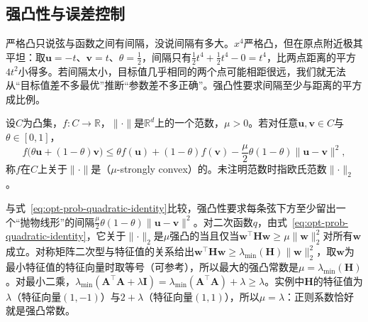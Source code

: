 \subsection{强凸性与误差控制}
\label{sec:opt-prob-strong-convexity}

严格凸只说弦与函数之间有间隔，没说间隔有多大。$x^4$严格凸，但在原点附近极其平坦：取$\bm u=-t$、$\bm v=t$、$\theta=\frac12$，间隔只有$\frac12t^4+\frac12t^4-0=t^4$，比两点距离的平方$4t^2$小得多。若间隔太小，目标值几乎相同的两个点可能相距很远，我们就无法从“目标值差不多最优”推断“参数差不多正确”。强凸性要求间隔至少与距离的平方成比例。

\begin{definition}[强凸性]
\label{def:opt-prob-strong-convex}
设$C$为凸集，$f:C\to\mathbb R$，$\lVert\cdot\rVert$是$\mathbb R^d$上的一个范数，$\mu>0$。若对任意$\bm u,\bm v\in C$与$\theta\in[0,1]$，
\begin{equation}
  f\bigl(\theta\bm u+(1-\theta)\bm v\bigr)\leq\theta f(\bm u)+(1-\theta)f(\bm v)-\frac{\mu}{2}\theta(1-\theta)\lVert\bm u-\bm v\rVert^2,
  \label{eq:opt-prob-strong-convexity}
\end{equation}
称$f$在$C$上关于$\lVert\cdot\rVert$是（$\mu$-strongly convex）的。未注明范数时指欧氏范数$\lVert\cdot\rVert_2$。
\end{definition}

与式~\eqref{eq:opt-prob-quadratic-identity}比较，强凸性要求每条弦下方至少留出一个“抛物线形”的间隔$\frac{\mu}{2}\theta(1-\theta)\lVert\bm u-\bm v\rVert^2$。对二次函数$q$，由式~\eqref{eq:opt-prob-quadratic-identity}，它关于$\lVert\cdot\rVert_2$是$\mu$强凸的当且仅当$\bm w^\top\bm H\bm w\geq\mu\lVert\bm w\rVert_2^2$对所有$\bm w$成立。对称矩阵二次型与特征值的关系给出$\bm w^\top\bm H\bm w\geq\lambda_{\min}(\bm H)\lVert\bm w\rVert_2^2$，取$\bm w$为最小特征值的特征向量时取等号（可参考），所以最大的强凸常数是$\mu=\lambda_{\min}(\bm H)$。对最小二乘，$\lambda_{\min}(\bm A^\top\bm A+\lambda\bm I)=\lambda_{\min}(\bm A^\top\bm A)+\lambda\geq\lambda$。实例中$\bm H$的特征值为$\lambda$（特征向量$(1,-1)$）与$2+\lambda$（特征向量$(1,1)$），所以$\mu=\lambda$：正则系数恰好就是强凸常数。

